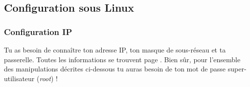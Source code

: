 




\subsection{Configuration sous Linux}

\subsubsection{Configuration IP}
Tu as besoin de conna\^itre ton adresse IP, ton masque de sous-r\'eseau et ta  passerelle. Toutes les informations se trouvent page \pageref{calcul_ip}. Bien s\^ur, pour  l'ensemble des manipulations d\'ecrites ci-dessous tu auras besoin de ton  mot de passe super-utilisateur (\emph{root}) !

